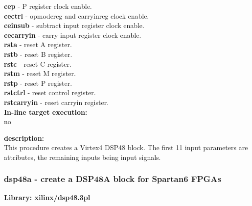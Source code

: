             {\bf cep} - P register clock enable. \\
            {\bf cectrl} - opmodereg and carryinreg clock enable. \\
            {\bf ceinsub} - subtract input register clock enable. \\
            {\bf cecarryin} - carry input register clock enable. \\
            {\bf rsta} - reset A register. \\
            {\bf rstb} - reset B register. \\
            {\bf rstc} - reset C register. \\
            {\bf rstm} - reset M register. \\
            {\bf rstp} - reset P register. \\
            {\bf rstctrl} - reset control register. \\
            {\bf rstcarryin} - reset carryin register. \\

            {\bf In-line target execution:} \\
            no

            {\bf description:} \\
            This procedure creates a Virtex4 DSP48 block. The first 11 input
            parameters are attributes, the remaining inputs being input signals.



        \subsubsection{dsp48a - create a DSP48A block for Spartan6 FPGAs}\label{sec:lpdsp48a}

            {\bf Library: xilinx/dsp48.3pl}

